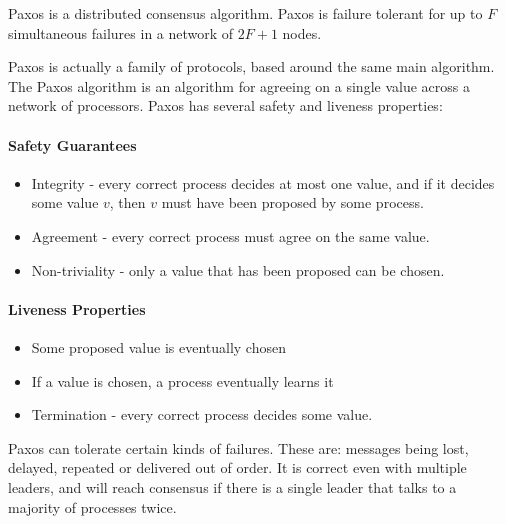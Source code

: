 \documentclass[12pt,twoside,notitlepage]{report}
\begin{document}
Paxos is a distributed consensus algorithm. Paxos is failure tolerant for up to $F$
simultaneous failures in a network of $2F + 1$ nodes.

Paxos is actually a family of protocols, based around the same main algorithm. The Paxos algorithm
is an algorithm for agreeing on a single value across a network of processors. Paxos has several
safety and liveness properties:

\paragraph{Safety Guarantees}

\begin{itemize}
\item Integrity - every correct process decides at most one value, and if it decides some value
	$v$, then $v$ must have been proposed by some process.
\item Agreement - every correct process must agree on the same value.
\item Non-triviality - only a value that has been proposed can be chosen.
\end{itemize}

%
%
%

\paragraph{Liveness Properties}

\begin{itemize}
\item Some proposed value is eventually chosen
\item If a value is chosen, a process eventually learns it
\item Termination - every correct process decides some value.
\end{itemize}

Paxos can tolerate certain kinds of failures. These are: messages being lost, delayed, repeated or
delivered out of order. It is correct even with multiple leaders, and will reach consensus if
there is a single leader that talks to a majority of processes twice.
\end{document}
